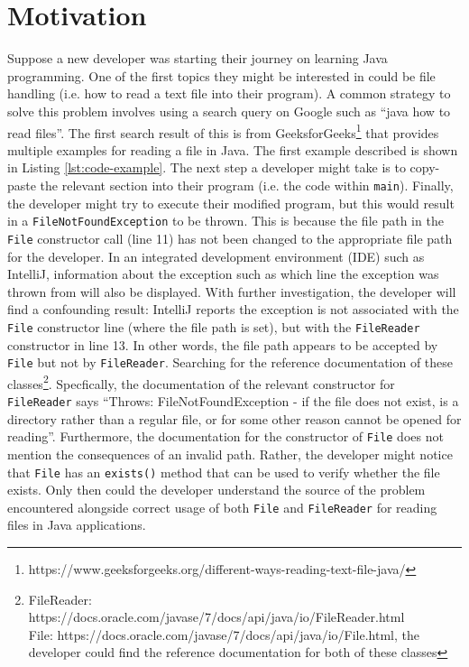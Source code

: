 \section{Motivation}
Suppose a new developer was starting their journey on learning Java programming. One of the first topics they might be interested in could be file handling (i.e. how to read a text file into their program). A common strategy to solve this problem involves using a search query on Google such as ``java how to read files''. The first search result of this is from GeeksforGeeks\footnote{https://www.geeksforgeeks.org/different-ways-reading-text-file-java/} that provides multiple examples for reading a file in Java. The first example described is shown in Listing  \ref{lst:code-example}. The next step a developer might take is to copy-paste the relevant section into their program (i.e. the code within \lstinline{main}). Finally, the developer might try to execute their modified program, but this would result in a \lstinline{FileNotFoundException} to be thrown. This is because the file path in the \lstinline{File} constructor call (line 11) has not been changed to the appropriate file path for the developer. In an integrated development environment (IDE) such as IntelliJ,  information about the exception such as which line the exception was thrown from will also be displayed. With further investigation, the developer will find a confounding result: IntelliJ reports the exception is not associated with the \lstinline{File} constructor line (where the file path is set), but with the \lstinline{FileReader} constructor in line 13. In other words, the file path appears to be accepted by \lstinline{File} but not by \lstinline{FileReader}. Searching for the reference documentation of these classes\footnote{FileReader: https://docs.oracle.com/javase/7/docs/api/java/io/FileReader.html \\\indent File: https://docs.oracle.com/javase/7/docs/api/java/io/File.html, the developer could find the reference documentation for both of these classes}. Specfically, the documentation of the relevant constructor for \lstinline{FileReader} says ``Throws: FileNotFoundException - if the file does not exist, is a directory rather than a regular file, or for some other reason cannot be opened for reading''. Furthermore, the documentation for the constructor of \lstinline{File} does not mention the consequences of an invalid path. Rather, the developer might notice that \lstinline{File} has an \lstinline{exists()} method that can be used to verify whether the file exists. Only then could the developer understand the source of the problem encountered alongside correct usage of both \lstinline{File} and \lstinline{FileReader} for reading files in Java applications.
